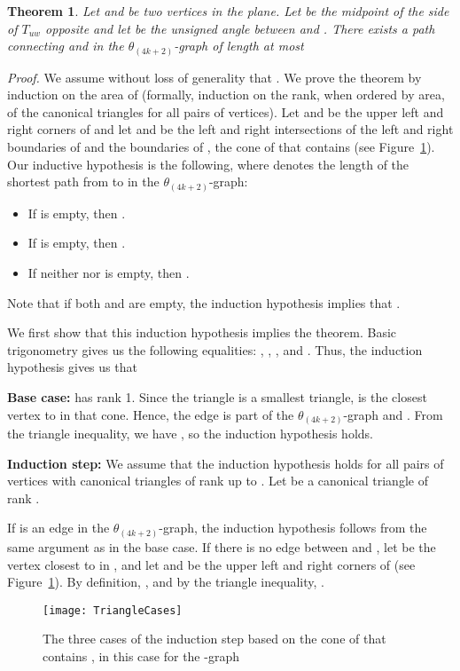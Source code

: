 \documentclass[12pt]{article}
\newtheorem{theo}[defin]{Theorem}
\newenvironment{theorem}{\begin{theo} \sl}{\end{theo}}
\newenvironment{proof}{\emph{Proof.}}{\hfill \\}
\newcommand{\graph}[1]{\ensuremath{\theta_{(4 k + #1)}}-graph\xspace}
\newcommand{\canon}[2]{\ensuremath{T_{#1 #2}}}
\begin{document}
\begin{theorem}
  \label{theo:PathLength}
  Let  and  be two vertices in the plane. Let  be the midpoint of the side of \canon{u}{w} opposite  and let  be the unsigned angle between  and . There exists a path connecting  and  in the \graph{2} of length at most  
\end{theorem}
\begin{proof}
  We assume without loss of generality that . We prove the theorem by induction on the area of  (formally, induction on the rank, when ordered by area, of the canonical triangles for all pairs of vertices). Let  and  be the upper left and right corners of  and let  and  be the left and right intersections of the left and right boundaries of  and the boundaries of , the cone of  that contains  (see Figure~\ref{fig:TriangleCases}). Our inductive hypothesis is the following, where  denotes the length of the shortest path from  to  in the \graph{2}:
  \begin{itemize}
    \item If  is empty, then .
    \item If  is empty, then .
    \item If neither  nor  is empty, then . 
  \end{itemize}
  Note that if both  and  are empty, the induction hypothesis implies that . 

  We first show that this induction hypothesis implies the theorem. Basic trigonometry gives us the following equalities: , , , and . Thus, the induction hypothesis gives us that  

  \textbf{Base case:}  has rank 1. Since the triangle is a smallest triangle,  is the closest vertex to  in that cone. Hence, the edge  is part of the \graph{2} and . From the triangle inequality, we have , so the induction hypothesis holds.

  \textbf{Induction step:} We assume that the induction hypothesis holds for all pairs of vertices with canonical triangles of rank up to . Let  be a canonical triangle of rank .

  If  is an edge in the \graph{2}, the induction hypothesis follows from the same argument as in the base case. If there is no edge between  and , let  be the vertex closest to  in , and let  and  be the upper left and right corners of  (see Figure~\ref{fig:TriangleCases}). By definition, , and by the triangle inequality, .

  \begin{figure}[ht]
    \begin{center}
      \texttt{[image: TriangleCases]}
    \end{center}
    \caption{The three cases of the induction step based on the cone of  that contains , in this case for the -graph}
    \label{fig:TriangleCases}
  \end{figure}


\end{proof}
\end{document}
